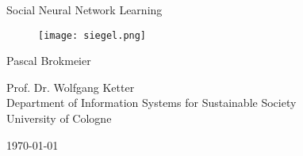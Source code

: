 \begin{titlepage}
\setlength{\parindent}{0pt} %
\begin{center}

\Huge{Social Neural Network Learning}

\vspace{10mm}
\begin{figure}[!h]
    \centering
    \texttt{[image: siegel.png]}
\end{figure}

\vspace{10mm}

\small{
Pascal Brokmeier
}
\vspace{10mm}

\small{Prof. Dr. Wolfgang Ketter \\
Department of Information Systems for Sustainable Society \\
University of Cologne\\}

\vspace{10mm}
\today
{}
\end{center}
\end{titlepage}
